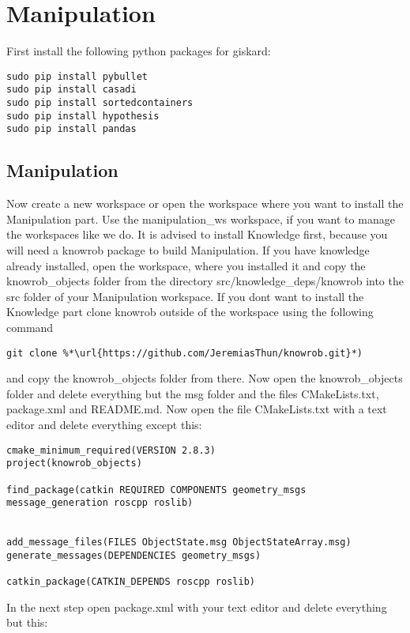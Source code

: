 \documentclass[main.tex]{subfiles}
\begin{document}
\section{Manipulation}
\label{sec:Manipulation}

First install the following python packages for giskard:\\

\begin{lstlisting}
sudo pip install pybullet
sudo pip install casadi
sudo pip install sortedcontainers
sudo pip install hypothesis
sudo pip install pandas
\end{lstlisting}
	
	\subsection{Manipulation}
Now create a new workspace or open the workspace where you want to install the Manipulation part. Use the manipulation\_ws workspace, if you want to manage the workspaces like we do.
It is advised to install Knowledge first, because you will need a knowrob package to build Manipulation.
If you have knowledge already installed, open the workspace, where you installed it and copy the knowrob\_objects folder from the directory src/knowledge\_deps/knowrob into the src folder of your Manipulation workspace. If you dont want to install the Knowledge part clone knowrob outside of the workspace using the following command\\
\begin{lstlisting}
git clone %*\url{https://github.com/JeremiasThun/knowrob.git}*)
\end{lstlisting}
and copy the knowrob\_objects folder from there.
 Now open the knowrob\_objects folder and delete everything but  the msg folder and the files CMakeLists.txt, package.xml and README.md.
Now open the file CMakeLists.txt with a text editor and delete everything except this:\\
\begin{lstlisting}
cmake_minimum_required(VERSION 2.8.3)
project(knowrob_objects)

find_package(catkin REQUIRED COMPONENTS geometry_msgs message_generation roscpp roslib)


add_message_files(FILES ObjectState.msg ObjectStateArray.msg)
generate_messages(DEPENDENCIES geometry_msgs)

catkin_package(CATKIN_DEPENDS roscpp roslib)
\end{lstlisting}
In the next step open package.xml with your text editor and delete everything but this:\\
\end{document}

